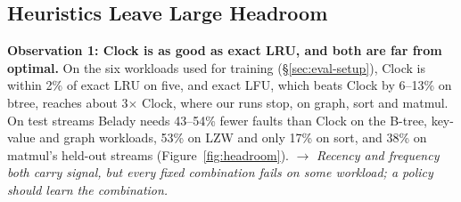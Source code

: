 \documentclass{article}
\newcommand{\clock}{Clock\xspace}
\newcommand{\belady}{Belady\xspace}
\newcommand{\obs}[2]{\textbf{Observation #1: #2}\hspace{0.4em}}
\begin{document}
\subsection{Heuristics Leave Large Headroom}
\label{sec:bg-headroom}

\obs{1}{\clock is as good as exact LRU, and both are far from optimal.}
On the six workloads used for training (\S\ref{sec:eval-setup}), \clock is within 2\%
of exact LRU on five, and exact LFU, which beats \clock by 6--13\% on btree, reaches about
3$\times$ \clock, where our runs stop, on graph, sort and matmul. On test streams \belady
needs 43--54\% fewer faults than \clock on the B-tree, key-value and graph workloads, 53\%
on LZW and only 17\% on sort, and 38\% on matmul's held-out streams
(Figure~\ref{fig:headroom}).
$\rightarrow$ \emph{Recency and frequency both carry signal, but every fixed combination
fails on some workload; a policy should learn the combination.}
\end{document}
